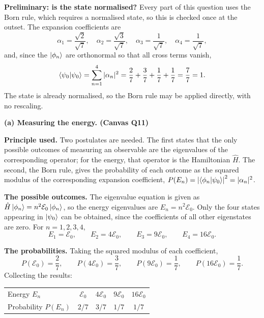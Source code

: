 \documentclass[12pt]{article}
\newif\ifsolutions
\newcommand{\problemsep}{\vspace{0.8em}}
\begin{document}
\ifsolutions
\begin{solutionbox}

\textbf{Preliminary: is the state normalised?} Every part of this question uses the Born rule, which requires a normalised state, so this is checked once at the outset. The expansion coefficients are
\[
    \alpha_{1}=\frac{\sqrt{2}}{\sqrt{7}},\quad
    \alpha_{2}=\frac{\sqrt{3}}{\sqrt{7}},\quad
    \alpha_{3}=\frac{1}{\sqrt{7}},\quad
    \alpha_{4}=\frac{1}{\sqrt{7}} ,
\]
and, since the $\ket{\phi_{n}}$ are orthonormal so that all cross terms vanish,
\[
    \braket{\psi_{0}|\psi_{0}}=\sum_{n=1}^{4}|\alpha_{n}|^{2}
    =\frac{2}{7}+\frac{3}{7}+\frac{1}{7}+\frac{1}{7}
    =\frac{7}{7}=1 .
\]
The state is already normalised, so the Born rule may be applied directly, with no rescaling.

\problemsep
\textbf{(a) Measuring the energy. \hfill (Canvas Q11)}

\textbf{Principle used.} Two postulates are needed. The first states that the only possible outcomes of measuring an observable are the eigenvalues of the corresponding operator; for the energy, that operator is the Hamiltonian $\hat{H}$. The second, the Born rule, gives the probability of each outcome as the squared modulus of the corresponding expansion coefficient, $P(E_{n})=\left|\braket{\phi_{n}|\psi_{0}}\right|^{2}=|\alpha_{n}|^{2}$.

\textbf{The possible outcomes.} The eigenvalue equation is given as $\hat{H}\ket{\phi_{n}}=n^{2}\mathcal{E}_{0}\ket{\phi_{n}}$, so the energy eigenvalues are $E_{n}=n^{2}\mathcal{E}_{0}$. Only the four states appearing in $\ket{\psi_{0}}$ can be obtained, since the coefficients of all other eigenstates are zero. For $n=1,2,3,4$,
\[
    E_{1}=\mathcal{E}_{0},\qquad
    E_{2}=4\mathcal{E}_{0},\qquad
    E_{3}=9\mathcal{E}_{0},\qquad
    E_{4}=16\mathcal{E}_{0}.
\]

\textbf{The probabilities.} Taking the squared modulus of each coefficient,
\[
    P(\mathcal{E}_{0})=\frac{2}{7},\qquad
    P(4\mathcal{E}_{0})=\frac{3}{7},\qquad
    P(9\mathcal{E}_{0})=\frac{1}{7},\qquad
    P(16\mathcal{E}_{0})=\frac{1}{7}.
\]
Collecting the results:
\begin{center}
\begin{tabular}{lcccc}
\hline
Energy $E_{n}$ & $\mathcal{E}_{0}$ & $4\mathcal{E}_{0}$ & $9\mathcal{E}_{0}$ & $16\mathcal{E}_{0}$ \\
Probability $P(E_{n})$ & $2/7$ & $3/7$ & $1/7$ & $1/7$ \\
\hline
\end{tabular}
\end{center}


\end{solutionbox}
\end{document}
